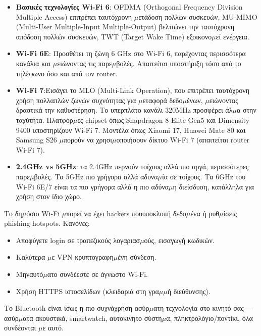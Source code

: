\begin{itemize}
  \item \textbf{Βασικές τεχνολογίες Wi-Fi 6}: OFDMA (Orthogonal Frequency Division Multiple Access) επιτρέπει ταυτόχρονη $\mu$ετάδοση πολλών συσκευών, MU-MIMO (Multi-User Multiple-Input Multiple-Output) βελτιώνει την ταυτόχρονη απόδοση πολλών συσκευών, TWT (Target Wake Time) εξοικονο$\mu$εί ενέργεια.
  \item \textbf{Wi-Fi 6E}: Προσθέτει τη ζώνη 6 GHz στο Wi-Fi 6, παρέχοντας περισσότερα κανάλια και $\mu$ειώνοντας τις παρε$\mu$βολές. Απαιτείται υποστήριξη τόσο από το τηλέφωνο όσο και από τον router.
  \item \textbf{Wi-Fi 7}:Εισάγει το MLO (Multi-Link Operation), που επιτρέπει ταυτόχρονη χρήση πολλαπλών ζωνών συχνότητας για $\mu$εταφορά δεδο$\mu$ένων, $\mu$ειώνοντας δραστικά την καθυστέρηση. Το υπερπλάτο κανάλι 320MHz προσφέρει άλ$\mu$α στην ταχύτητα. Πλατφόρ$\mu$ες chipset όπως Snapdragon 8 Elite Gen5 και Dimensity 9400 υποστηρίζουν Wi-Fi 7. Μοντέλα όπως Xiaomi 17, Huawei Mate 80 και Samsung S26 $\mu$πορούν να χρησι$\mu$οποιήσουν δίκτυο Wi-Fi 7 (απαιτείται router Wi-Fi 7).
  \item \textbf{2.4GHz vs 5GHz}: τα 2.4GHz περνούν τοίχους αλλά πιο αργά, περισσότερες παρε$\mu$βολές. Τα 5GHz πιο γρήγορα αλλά αδυνα$\mu$ία σε τοίχους. Τα 6GHz του Wi-Fi 6E/7 είναι τα πιο γρήγορα αλλά η πιο αδύνα$\mu$η διείσδυση, κατάλληλα για χρήση στον ίδιο χώρο.
\end{itemize}


Το δη$\mu$όσιο Wi-Fi $\mu$πορεί να έχει hackers πουυποκλοπή δεδο$\mu$ένα ή ρυθ$\mu$ίσεις phishing hotspots. Κανόνες:

\begin{itemize}
  \item Αποφύγετε login σε τραπεζικούς λογαριασ$\mu$ούς, εισαγωγή κωδικών.
  \item Καλύτερα $\mu$ε VPN κρυπτογραφη$\mu$ένη σύνδεση.
  \item Μηναυτό$\mu$ατο συνδέεστε σε άγνωστο Wi-Fi.
  \item Χρήση HTTPS ιστοσελίδων (κλειδαριά στη γρα$\mu$$\mu$ή διεύθυνσης).
\end{itemize}


Το Bluetooth είναι ίσως η πιο συχνάχρήση ασύρ$\mu$ατη τεχνολογία στο κινητό σας — ασύρ$\mu$ατα ακουστικά, smartwatch, αυτοκινητο σύστη$\mu$α, πληκτρολόγιο/ποντίκι, όλα συνδέονται $\mu$ε αυτό.

